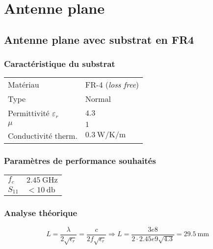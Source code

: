 \documentclass[Deriaz_Traiber_Labo02]{subfiles}
\begin{document}
\section{Antenne plane}

\subsection{Antenne plane avec substrat en FR4}

\subsubsection{Caractéristique du substrat}

\begin{table}[H]
\centering
\begin{tabular}{ l  l }
Matériau & FR-4 (\textit{loss free})\\
Type & Normal \\
Permittivité $\varepsilon_r$ & $\SI{4.3}{}$ \\
$\mu$	& $1$ \\
Conductivité therm. & $\SI{0.3}{\watt\per\kelvin\per\meter}$ \\
\end{tabular}
\end{table}

\subsubsection{Paramètres de performance souhaités}

\begin{table}[H]
\centering
\begin{tabular}{l  l}
$f_c$ & $\SI{2.45}{\giga\hertz}$ \\
$S_{11}$ & $< \SI{10}{\decibel}$\\
\end{tabular}
\end{table}


\subsubsection{Analyse théorique}
$$
\boxed{L = \dfrac{\lambda}{2\sqrt{\epsilon_r}} = \dfrac{c}{2 f \sqrt{\epsilon_r}}} \Rightarrow \boxed{L = \dfrac{3e8}{2\cdot2.45e9\sqrt{4.3}}=\SI{29.5}{\milli\meter}}
$$
\end{document}
